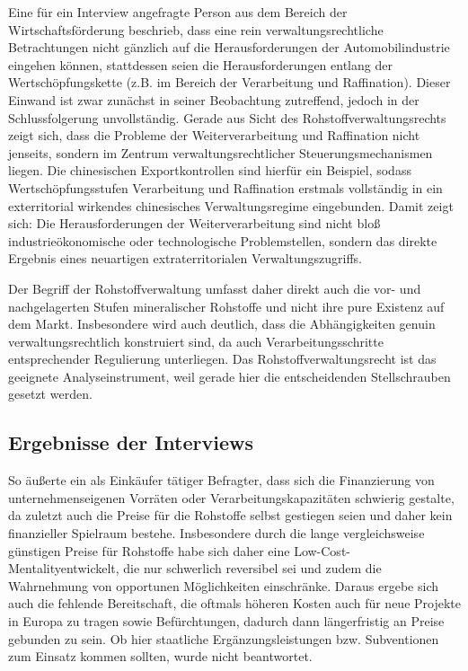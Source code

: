 \documentclass[12pt,a4paper,oneside]{book} %
\begin{document}
Eine für ein Interview angefragte Person aus dem Bereich der Wirtschaftsförderung beschrieb, dass eine rein verwaltungsrechtliche Betrachtungen nicht gänzlich auf die Herausforderungen der Automobilindustrie eingehen können, stattdessen seien die Herausforderungen entlang der Wertschöpfungskette (z.B. im Bereich der Verarbeitung und Raffination). Dieser Einwand ist zwar zunächst in seiner Beobachtung zutreffend, jedoch in der Schlussfolgerung unvollständig. Gerade aus Sicht des Rohstoffverwaltungsrechts zeigt sich, dass die Probleme der Weiterverarbeitung und Raffination nicht jenseits, sondern im Zentrum verwaltungsrechtlicher Steuerungsmechanismen liegen. Die chinesischen Exportkontrollen sind hierfür ein Beispiel, sodass Wertschöpfungsstufen Verarbeitung und Raffination erstmals vollständig in ein exterritorial wirkendes chinesisches Verwaltungsregime eingebunden. Damit zeigt sich: Die Herausforderungen der Weiterverarbeitung sind nicht bloß industrieökonomische oder technologische Problemstellen, sondern das direkte Ergebnis eines neuartigen extraterritorialen Verwaltungszugriffs.

Der Begriff der Rohstoffverwaltung umfasst daher direkt auch die vor- und nachgelagerten Stufen mineralischer Rohstoffe und nicht ihre pure Existenz auf dem Markt. Insbesondere wird auch deutlich, dass die Abhängigkeiten genuin verwaltungsrechtlich konstruiert sind, da auch Verarbeitungsschritte entsprechender Regulierung unterliegen. Das Rohstoffverwaltungsrecht ist das geeignete Analyseinstrument, weil gerade hier die entscheidenden Stellschrauben gesetzt werden.



\subsection{Ergebnisse der Interviews}

So äußerte ein als Einkäufer tätiger Befragter, dass sich die Finanzierung von unternehmenseigenen Vorräten oder Verarbeitungskapazitäten schwierig gestalte, da zuletzt auch die Preise für die Rohstoffe selbst gestiegen seien und daher kein finanzieller Spielraum bestehe. Insbesondere durch die lange vergleichsweise günstigen Preise für Rohstoffe habe sich daher eine \glqq Low-Cost-Mentality\grqq entwickelt, die nur schwerlich reversibel sei und zudem die Wahrnehmung von opportunen Möglichkeiten einschränke. Daraus ergebe sich auch die fehlende Bereitschaft, die oftmals höheren Kosten auch für neue Projekte in Europa zu tragen sowie Befürchtungen, dadurch dann längerfristig an Preise gebunden zu sein. Ob hier staatliche Ergänzungsleistungen bzw. Subventionen zum Einsatz kommen sollten, wurde nicht beantwortet.
\end{document}
